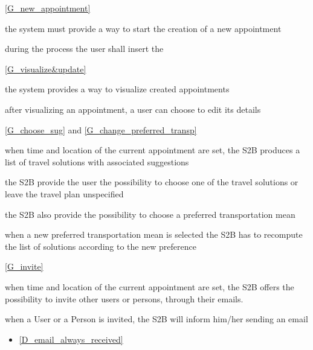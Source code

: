 	\noindent\ref{G_new_appointment}
	\begin{enumerate}[resume, label={[R\arabic*]}]
	\item \label{R_new_appointment} the system must provide a way to start the creation of a new appointment
	\item \label{R_appointment_details} during the process the user shall insert the 	
	\end{enumerate}
	
	\noindent\ref{G_visualize&update}
	\begin{enumerate}[resume, label={[R\arabic*]}]
		\item \label{R_visualize} the system provides a way to visualize created appointments
		\item \label{R_edit_details} after visualizing an appointment, a user can choose to edit its details
	\end{enumerate}
	
	\noindent\ref{G_choose_sug} and \ref{G_change_preferred_transp}
	\begin{enumerate}[resume, label={[R\arabic*]}]
	\item \label{R_solutions} when time and location of the current appointment are set, the S2B produces a list of travel solutions with associated suggestions
	\item \label{R_choose_solution} the S2B provide the user the possibility to choose one of the travel solutions or leave the travel plan unspecified
	\item \label{R_select_preferred} the S2B also provide the possibility to choose a preferred transportation mean
	\item \label{R_recompute_solutions} when a new preferred transportation mean is selected the S2B has to recompute the list of solutions according to the new preference
	\end{enumerate}
	
	\noindent\ref{G_invite}
	\begin{enumerate}[resume, label={[R\arabic*]}]
	\item \label{R_can_invite} when time and location of the current appointment are set, the S2B offers the possibility to invite other users or persons, through their emails.
	\item \label{R_invite_send_email} when a User or a Person is invited, the S2B will inform him/her sending an email
	\end{enumerate}
	\begin{itemize}
		\item[] \ref{D_email_always_received}
	\end{itemize}
	
